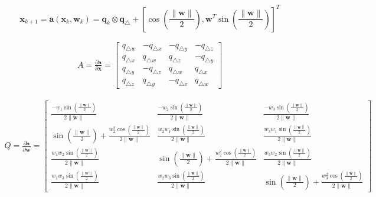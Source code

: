 \documentclass[11pt]{article}
\begin{document}
$$
\bm{x}_{k+1} = \bm{a}(\bm{x}_k,\bm{w}_k) 
= \bm{q}_k \otimes \bm{q}_\triangle + \left [ \cos\left(\frac{\left \| \bm{w} \right \|}{2}\right), \bm{w}^T \sin\left(\frac{\left \| \bm{w} \right \|}{2}\right) \right]^T    
$$

\begin{align*}
A = \frac{\partial \bm{a} }{\partial \bm{x}} = \begin{bmatrix}
q_{\triangle w} &  -q_{\triangle x} &  -q_{\triangle y} & -q_{\triangle z}\\ 
q_{\triangle x} &   q_{\triangle w} &   q_{\triangle z} & -q_{\triangle y}\\ 
q_{\triangle y} &  -q_{\triangle z} &   q_{\triangle w} &  q_{\triangle x}\\ 
q_{\triangle z} &   q_{\triangle y} &  -q_{\triangle x} &  q_{\triangle w}
\end{bmatrix}
\end{align*}

\begin{align*}
Q = \frac{\partial \bm{a} }{\partial \bm{w}} = \begin{bmatrix}
\frac{-w_1 \sin \left( \frac{\left \| \bm{w} \right \|}{2}\right)}{2 \left \| \bm{w} \right \|}
&  
\frac{-w_2 \sin \left( \frac{\left \| \bm{w} \right \|}{2}\right)}{2 \left \| \bm{w} \right \|}
&  
\frac{-w_3 \sin \left( \frac{\left \| \bm{w} \right \|}{2}\right)}{2 \left \| \bm{w} \right \|}
\\ 
\sin \left( \frac{\left \| \bm{w} \right \|}{2} \right) + \frac{w_2^2 \cos \left( \frac{\left \| \bm{w} \right \|}{2}\right)}{2 \left \| \bm{w} \right \|}
&
\frac{w_2 w_1 \sin \left( \frac{\left \| \bm{w} \right \|}{2}\right)}{2 \left \| \bm{w} \right \|}
&   
\frac{w_3 w_1 \sin \left( \frac{\left \| \bm{w} \right \|}{2}\right)}{2 \left \| \bm{w} \right \|}
\\ 
\frac{w_1 w_2 \sin \left( \frac{\left \| \bm{w} \right \|}{2}\right)}{2 \left \| \bm{w} \right \|}
&  
\sin \left( \frac{\left \| \bm{w} \right \|}{2} \right) + \frac{w_2^2 \cos \left( \frac{\left \| \bm{w} \right \|}{2}\right)}{2 \left \| \bm{w} \right \|}
&   
\frac{w_3 w_2 \sin \left( \frac{\left \| \bm{w} \right \|}{2}\right)}{2 \left \| \bm{w} \right \|}
\\ 
\frac{w_1 w_3 \sin \left( \frac{\left \| \bm{w} \right \|}{2}\right)}{2 \left \| \bm{w} \right \|}
&   
\frac{w_2 w_3 \sin \left( \frac{\left \| \bm{w} \right \|}{2}\right)}{2 \left \| \bm{w} \right \|}
&  
\sin \left( \frac{\left \| \bm{w} \right \|}{2} \right) + \frac{w_3^2 \cos \left( \frac{\left \| \bm{w} \right \|}{2}\right)}{2 \left \| \bm{w} \right \|}
\end{bmatrix}
\end{align*}
\end{document}
